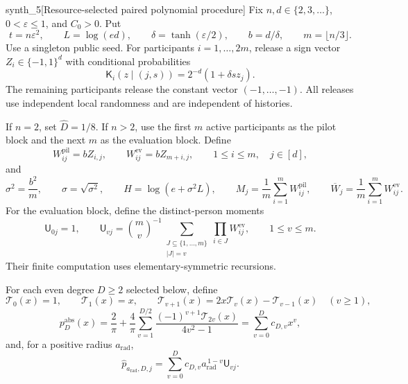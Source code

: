 \documentclass[11pt]{article}
\begin{document}
\begin{definitionv}{synth_5}[Resource-selected paired polynomial procedure]
Fix \(n,d\in\{2,3,\ldots\}\), \(0<\varepsilon\le1\), and \(C_0>0\). Put
\[
t=n\varepsilon^2,\qquad L=\log(ed),\qquad
\delta=\tanh(\varepsilon/2),\qquad b=d/\delta,
\qquad m=\lfloor n/3\rfloor.
\]
Use a singleton public seed. For participants \(i=1,\ldots,2m\), release a sign vector \(Z_i\in\{-1,1\}^d\) with conditional probabilities
\[
\mathsf K_i(z\mid(j,s))
=2^{-d}(1+\delta s z_j).
\]
The remaining participants release the constant vector \((-1,\ldots,-1)\). All releases use independent local randomness and are independent of histories.

If \(n=2\), set \(\widehat D=1/8\). If \(n>2\), use the first \(m\) active participants as the pilot block and the next \(m\) as the evaluation block. Define
\[
W^{\mathrm{pil}}_{ij}=bZ_{i,j},
\qquad
W^{\mathrm{ev}}_{ij}=bZ_{m+i,j},
\qquad 1\le i\le m,\quad j\in[d],
\]
and
\[
\sigma^2=\frac{b^2}{m},\qquad
\sigma=\sqrt{\sigma^2},\qquad
H=\log(e+\sigma^2L),\qquad
M_j=\frac1m\sum_{i=1}^mW^{\mathrm{pil}}_{ij},
\qquad
\overline W_j=\frac1m\sum_{i=1}^mW^{\mathrm{ev}}_{ij}.
\]
For the evaluation block, define the distinct-person moments
\[
\mathsf U_{0j}=1,\qquad
\mathsf U_{vj}
=\binom mv^{-1}
\sum_{\substack{J\subseteq\{1,\ldots,m\}\\ |J|=v}}
\prod_{i\in J}W^{\mathrm{ev}}_{ij},
\qquad 1\le v\le m.
\]
Their finite computation uses elementary-symmetric recursions.

For each even degree \(D\ge2\) selected below, define
\[
\mathcal T_0(x)=1,\qquad
\mathcal T_1(x)=x,\qquad
\mathcal T_{v+1}(x)=2x\mathcal T_v(x)-\mathcal T_{v-1}(x)
\quad(v\ge1),
\]
\[
p_D^{\mathrm{abs}}(x)
=\frac2\pi+\frac4\pi
\sum_{v=1}^{D/2}
\frac{(-1)^{v+1}\mathcal T_{2v}(x)}{4v^2-1}
=\sum_{v=0}^Dc_{D,v}x^v,
\]
and, for a positive radius \(a_{\mathrm{rad}}\),
\[
\widehat p_{a_{\mathrm{rad}},D,j}
=\sum_{v=0}^D
c_{D,v}a_{\mathrm{rad}}^{\,1-v}\mathsf U_{vj}.
\]


\end{definitionv}
\end{document}
